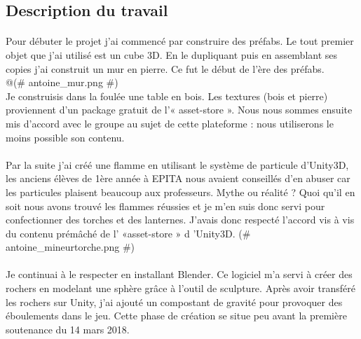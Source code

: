 \documentclass[titlepage, 13px, a4paper]{report}
\begin{document}
\subsection{Description du travail}

\paragraph{} \hspace{0pt} 
Pour débuter le projet j'ai commencé par construire des préfabs. Le tout premier
objet que j'ai utilisé est un cube 3D. En le dupliquant puis en assemblant ses
copies j'ai construit un mur en pierre. Ce fut le début de l'ère des préfabs. \\@(\# antoine\_mur.png \#)\@  \\
Je construisis dans la foulée une table en bois. Les textures (bois et pierre)
proviennent d'un package gratuit de l'« asset-store ». Nous nous sommes ensuite
mis d'accord avec le groupe au sujet de cette plateforme : nous utiliserons le
moins possible son contenu. \\

\paragraph{} \hspace{0pt} 
Par la suite j'ai créé une flamme en utilisant le système de particule d'Unity3D, les
anciens élèves de 1ère année à EPITA nous avaient conseillés d'en abuser car les
particules plaisent beaucoup aux professeurs. Mythe ou réalité ? Quoi qu'il en soit
nous avons trouvé les flammes réussies et je m'en suis donc servi pour
confectionner des torches et des lanternes. J'avais donc respecté l'accord vis à vis
du contenu prémâché de l' «asset-store » d 'Unity3D. \@(\# antoine\_mineurtorche.png \#)\@ \\


\paragraph{} \hspace{0pt} 
Je continuai à le respecter en installant Blender. Ce logiciel m'a servi à créer des
rochers en modelant une sphère grâce à l'outil de sculpture. Après avoir transféré
les rochers sur Unity, j'ai ajouté un compostant de gravité pour provoquer des
éboulements dans le jeu. Cette phase de création se situe peu avant la première
soutenance du 14 mars 2018. \\
\end{document}
